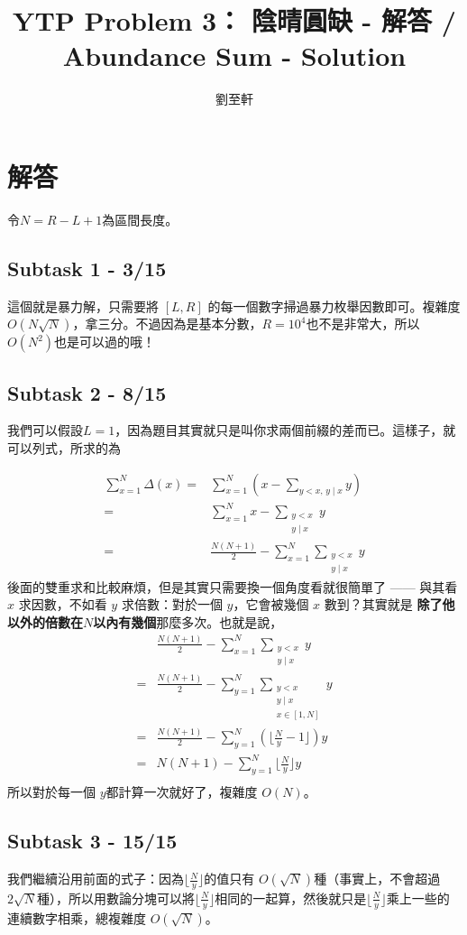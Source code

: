 \documentclass[12pt,a4paper]{article}
\title{YTP Problem 3： 陰晴圓缺 - 解答 / Abundance Sum - Solution}
\author{劉至軒}
\newcommand{\floor}[1]{\lfloor#1\rfloor}
\newcommand{\divs}{\;|\;}
\theoremstyle{mystyle}	%
\begin{document}
	\maketitle
	\section*{解答}
		令$N = R - L + 1$為區間長度。
		\subsection*{Subtask 1 - 3/15}
			這個就是暴力解，只需要將 $[L, R]$ 的每一個數字掃過暴力枚舉因數即可。複雜度 $O(N\sqrt{N})$，拿三分。不過因為是基本分數，$R = 10^4$也不是非常大，所以$O(N^2)$也是可以過的哦！
		\subsection*{Subtask 2 - 8/15}
			我們可以假設$L = 1$，因為題目其實就只是叫你求兩個前綴的差而已。這樣子，就可以列式，所求的為 
			
			\begin{align*}
				\sum_{x = 1}^N \Delta(x) =&\sum_{x = 1}^{N} \left(x - \sum_{y < x,\, y \divs x} y\right)\\
				= &\sum_{x = 1}^{N}x -  \sum_{\substack{y < x\\ y \divs x}} y\\
				= &\frac{N(N + 1)}{2} - \sum_{x = 1}^{N} \sum_{\substack{y < x\\ y \divs x}} y
			\end{align*}
			後面的雙重求和比較麻煩，但是其實只需要換一個角度看就很簡單了 —— 與其看 $x$ 求因數，不如看 $y$ 求倍數：對於一個 $y$，它會被幾個 $x$ 數到？其實就是 \textbf{除了他以外的倍數在$N$以內有幾個}那麼多次。也就是說，
			\begin{align*}
				&\frac{N(N + 1)}{2} - \sum_{x = 1}^{N} \sum_{\substack{y < x\\ y \divs x}} y\\
				= &\frac{N(N + 1)}{2} - \sum_{y = 1}^{N} \sum_{\substack{y < x\\y \divs x\\x \in [1, N]}} y\\
				= &\frac{N(N + 1)}{2} - \sum_{y = 1}^{N} \left(\floor{\frac{N}{y} - 1}\right)y\\
				= &N(N + 1) - \sum_{y = 1}^{N} \floor{\frac{N}{y}}y\\
			\end{align*}
			所以對於每一個 $y$都計算一次就好了，複雜度 $O(N)$。
		\subsection*{Subtask 3 - 15/15}			
			我們繼續沿用前面的式子：因為$\floor{\frac{N}{y}}$的值只有 $O(\sqrt{N})$種（事實上，不會超過 $2\sqrt{N}$種），所以用數論分塊可以將$\floor{\frac{N}{y}}$相同的一起算，然後就只是$\floor{\frac{N}{y}}$乘上一些的連續數字相乘，總複雜度 $O(\sqrt{N})$。
\end{document}
